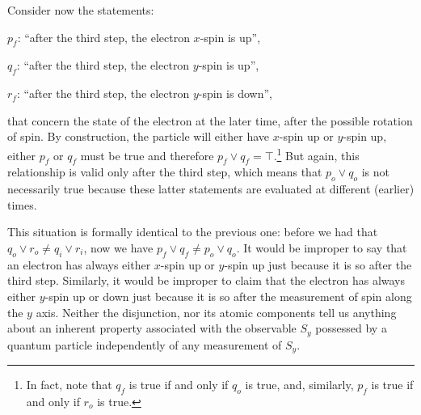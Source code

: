 \documentclass[11pt, executivepaper]{article}
\begin{document}
Consider now the statements:
\begin{description}
	\item $p_f$: ``after the third step, the electron $x$-spin is up'',
	\item $q_f$: ``after the third step, the electron $y$-spin is up'',
	\item $r_f$: ``after the third step, the electron $y$-spin is down'',
\end{description}
\noindent that concern the state of the electron at the later time, after the possible rotation of spin. By construction, the particle will either have $x$-spin up or $y$-spin up, either $p_f$ or $q_f$ must be true and therefore $p_f \vee q_f = \top$.\footnote{In fact, note that $q_f$ is true if and only if $q_o$ is true, and, similarly, $p_f$ is true if and only if $r_o$ is true.} But again, this relationship is valid only after the third step, which means that $p_o \vee q_o$ is not necessarily true because these latter statements are evaluated at different (earlier) times. 

This situation is formally identical to the previous one: before we had that $q_o \vee r_o \neq q_i \vee r_i$, now we have $p_f \vee q_f \neq p_o \vee q_o$. It would be improper to say that an electron has always either $x$-spin up or $y$-spin up just because it is so after the third step. Similarly, it would be improper to claim that the electron has always either $y$-spin up or down just because it is so after the measurement of spin along the $y$ axis. Neither the disjunction, nor its atomic components tell us anything about an inherent property associated with the observable $S_y$ possessed by a quantum particle independently of any measurement of $S_y$.
\end{document}
